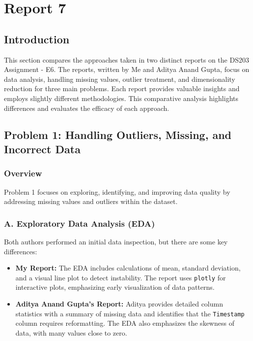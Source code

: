 \section*{Report 7}

\subsection*{Introduction}
This section compares the approaches taken in two distinct reports on the DS203 Assignment - E6. The reports, written by Me and Aditya Anand Gupta, focus on data analysis, handling missing values, outlier treatment, and dimensionality reduction for three main problems. Each report provides valuable insights and employs slightly different methodologies. This comparative analysis highlights differences and evaluates the efficacy of each approach.

\subsection*{Problem 1: Handling Outliers, Missing, and Incorrect Data}

\subsubsection*{Overview}
Problem 1 focuses on exploring, identifying, and improving data quality by addressing missing values and outliers within the dataset.

\subsubsection*{A. Exploratory Data Analysis (EDA)}
Both authors performed an initial data inspection, but there are some key differences:
\begin{itemize}
    \item \textbf{My Report:} The EDA includes calculations of mean, standard deviation, and a visual line plot to detect instability. The report uses \texttt{plotly} for interactive plots, emphasizing early visualization of data patterns.
    \item \textbf{Aditya Anand Gupta's Report:} Aditya provides detailed column statistics with a summary of missing data and identifies that the \texttt{Timestamp} column requires reformatting. The EDA also emphasizes the skewness of data, with many values close to zero.
\end{itemize}

